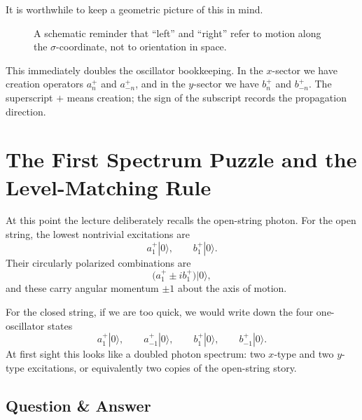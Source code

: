It is worthwhile to keep a geometric picture of this in mind.

\begin{figure}[t]
\centering
{}
\caption{A schematic reminder that ``left'' and ``right'' refer to motion along the \(\sigma\)-coordinate, not to orientation in space.}
\end{figure}

This immediately doubles the oscillator bookkeeping. In the \(x\)-sector we have creation operators \(a_n^+\) and \(a_{-n}^+\), and in the \(y\)-sector we have \(b_n^+\) and \(b_{-n}^+\). The superscript \(+\) means creation; the sign of the subscript records the propagation direction.

\section{The First Spectrum Puzzle and the Level-Matching Rule}

At this point the lecture deliberately recalls the open-string photon. For the open string, the lowest nontrivial excitations are
\begin{equation}
a_1^+|0\rangle,
\qquad
b_1^+|0\rangle.
\end{equation}
Their circularly polarized combinations are
\begin{equation}
\big(a_1^+ \pm i b_1^+\big)|0\rangle,
\end{equation}
and these carry angular momentum \(\pm 1\) about the axis of motion.

For the closed string, if we are too quick, we would write down the four one-oscillator states
\begin{equation}
a_1^+|0\rangle,
\qquad
a_{-1}^+|0\rangle,
\qquad
b_1^+|0\rangle,
\qquad
b_{-1}^+|0\rangle.
\end{equation}
At first sight this looks like a doubled photon spectrum: two \(x\)-type and two \(y\)-type excitations, or equivalently two copies of the open-string story.

\subsection{Question \& Answer}

